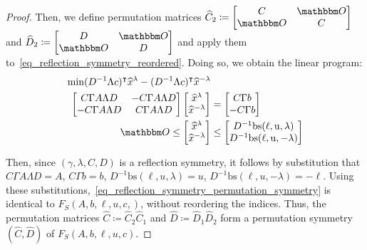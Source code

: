 \documentclass[pdflatex,sn-mathphys-num]{sn-jnl}%
\theoremstyle{thmstyleone}%
\theoremstyle{thmstylethree}%
\theoremstyle{thmstyletwo}%
\begin{document}
\begin{proof}
    Then, we define permutation matrices $\widehat{C}_2 \coloneqq \begin{bmatrix}
        C & \zerovec\\
        \zerovec & C
    \end{bmatrix}$ and $\widehat{D}_2 \coloneqq \begin{bmatrix}
        D & \zerovec\\
        \zerovec & D
    \end{bmatrix}$ and apply them to~\eqref{eq_reflection_symmetry_reordered}. Doing so, we obtain the linear program:
    \begin{subequations}    \label{eq_reflection_symmetry_permutation_symmetry}
    \begin{align}
        \min \transpose{(D^{-1} \Lambda c)} \widehat{x}^\lambda - \transpose{(D^{-1} \Lambda c)} \widehat{x}^{-\lambda}&\\
        \begin{bmatrix}
            C \Gamma A \Lambda D & - C\Gamma A \Lambda D\\
            -C\Gamma A \Lambda D & C\Gamma A \Lambda D
        \end{bmatrix} \begin{bmatrix}
            \widehat{x}^\lambda\\
            \widehat{x}^{-\lambda}
        \end{bmatrix} &= \begin{bmatrix}
            C\Gamma b\\
            - C\Gamma b
        \end{bmatrix}\\
        \zerovec \leq \begin{bmatrix}
            \widehat{x}^\lambda\\
            \widehat{x}^{-\lambda}
        \end{bmatrix} & \leq \begin{bmatrix}
            D^{-1} \mathrm{bs(\ell,u,\lambda)}\\
            D^{-1}\mathrm{bs(\ell,u,-\lambda)}
        \end{bmatrix} 
    \end{align}
    \end{subequations}
    
    Then, since $(\gamma,\lambda,C,D)$ is a reflection symmetry, it follows by substitution that $C \Gamma A \Lambda D = A$, $C \Gamma b = b$,
    $D^{-1} \mathrm{bs}(\ell,u,\lambda) = u$, $D^{-1} \mathrm{bs}(\ell,u,-\lambda) = - \ell$. Using these substitutions,~\eqref{eq_reflection_symmetry_permutation_symmetry} is identical to $F_S(A,b,\ell,u,c,)$, without reordering the indices. Thus, the permutation matrices $\widehat{C} \coloneqq \widehat{C}_2 \widehat{C}_1$ and $\widehat{D} \coloneqq \widehat{D}_1 \widehat{D}_2$ form a permutation symmetry $(\widehat{C},\widehat{D})$ of $F_S(A,b,\ell,u,c)$.
\end{proof}
\end{document}

